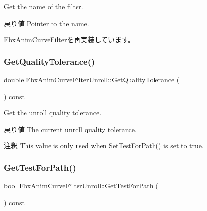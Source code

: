 Get the name of the filter. \begin{DoxyReturn}{戻り値}
Pointer to the name. 
\end{DoxyReturn}


\hyperlink{class_fbx_anim_curve_filter_abd559d5052fbb072042e59241940a35c}{Fbx\+Anim\+Curve\+Filter}を再実装しています。

\mbox{\label{class_fbx_anim_curve_filter_unroll_a881a4c7122073deec59ab208b2bdf95a}} 
\subsubsection{\texorpdfstring{Get\+Quality\+Tolerance()}{GetQualityTolerance()}}
{\footnotesize\ttfamily double Fbx\+Anim\+Curve\+Filter\+Unroll\+::\+Get\+Quality\+Tolerance (\begin{DoxyParamCaption}{ }\end{DoxyParamCaption}) const}

Get the unroll quality tolerance. \begin{DoxyReturn}{戻り値}
The current unroll quality tolerance. 
\end{DoxyReturn}
\begin{DoxyRemark}{注釈}
This value is only used when \hyperlink{class_fbx_anim_curve_filter_unroll_af87dabf0628d09c9864ed445f11f8c66}{Set\+Test\+For\+Path()} is set to true. 
\end{DoxyRemark}
\mbox{\label{class_fbx_anim_curve_filter_unroll_af073ba1c941aca18f6ba62a811bf8a02}} 
\subsubsection{\texorpdfstring{Get\+Test\+For\+Path()}{GetTestForPath()}}
{\footnotesize\ttfamily bool Fbx\+Anim\+Curve\+Filter\+Unroll\+::\+Get\+Test\+For\+Path (\begin{DoxyParamCaption}{ }\end{DoxyParamCaption}) const}


